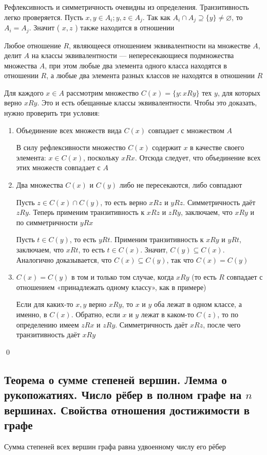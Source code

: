 \documentclass[a4paper]{article}
\begin{document}
Рефлексивность и симметричность очевидны из определения. Транзитивность легко проверяется. Пусть $x, y \in A_i ; y, z \in A_j$. Так как $A_i \cap A_j \supseteq\{y\} \neq \varnothing$, то $A_i=A_j$. Значит ( $x, z$ ) также находится в отношении

\theorem Любое отношение $R$, являющееся отношением эквивалентности на множестве $A$, делит $A$ на классы эквивалентности — непересекающиеся подмножества множества $A$, при этом любые два элемента одного класса находятся в отношении $R$, а любые два элемента разных классов не находятся в отношении $R$

\proof Для каждого $x \in A$ рассмотрим множество $C(x)=\{y: x R y\}$ тех $y$, для которых верно $x R y$. Это и есть обещанные классы эквивалентности. Чтобы это доказать, нужно проверить три условия:
\begin{enumerate}
    \item Объединение всех множеств вида $C(x)$ совпадает с множеством $A$
    
    В силу рефлексивности множество $C(x)$ содержит $x$ в качестве своего элемента: $x \in C(x)$, поскольку $x R x$. Отсюда следует, что объединение всех этих множеств совпадает с $A$

    \item Два множества $C(x)$ и $C(y)$ либо не пересекаются, либо совпадают
    
    Пусть $z \in C(x) \cap C(y)$, то есть верно $x R z$ и $y R z$. Симметричность даёт $z R y$. Теперь применим транзитивность к $x R z$ и $z R y$, заключаем, что $x R y$ и по симметричности $y R x$

    Пусть $t \in C(y)$, то есть $y R t$. Применим транзитивность к $x R y$ и $y R t$, заключаем, что $x R t$, то есть $t \in C(x)$. Значит, $C(y) \subseteq C(x)$. Аналогично доказывается, что $C(x) \subseteq C(y)$, так что $C(x)=C(y)$
    \item $C(x)=C(y)$ в том и только том случае, когда $x R y$ (то есть $R$ совпадает с отношением «принадлежать одному классу», как в примере)
    
    Если для каких-то $x, y$ верно $x R y$, то $x$ и $y$ оба лежат в одном классе, а именно, в $C(x)$. Обратно, если $x$ и $y$ лежат в каком-то $C(z)$, то по определению имеем $z R x$ и $z R y$. Симметричность даёт $x R z$, после чего транзитивность даёт $x R y$
\end{enumerate}\qed 


\subsection{Теорема о сумме степеней вершин. Лемма о рукопожатиях. Число рёбер в полном графе на $n$ вершинах. Свойства отношения достижимости в графе}
\theorem Сумма степеней всех вершин графа равна удвоенному числу его рёбер
\end{document}
